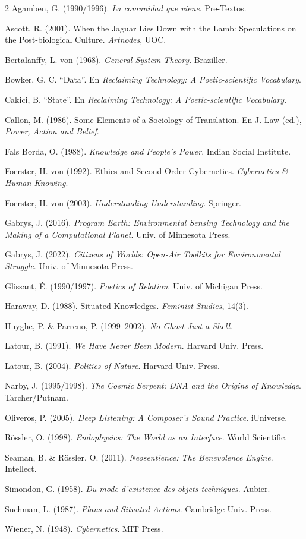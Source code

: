 \documentclass[11pt]{article}
\begin{document}
\begin{multicols}{2}\footnotesize\setlength{\parindent}{-1em}\setlength{\leftskip}{1em}\setlength{\parskip}{0.4em}
Agamben, G. (1990/1996). \emph{La comunidad que viene}. Pre-Textos.\par
Ascott, R. (2001). When the Jaguar Lies Down with the Lamb: Speculations on the Post-biological Culture. \emph{Artnodes}, UOC.\par
Bertalanffy, L. von (1968). \emph{General System Theory}. Braziller.\par
Bowker, G. C. ``Data''. En \emph{Reclaiming Technology: A Poetic-scientific Vocabulary}.\par
Cakici, B. ``State''. En \emph{Reclaiming Technology: A Poetic-scientific Vocabulary}.\par
Callon, M. (1986). Some Elements of a Sociology of Translation. En J. Law (ed.), \emph{Power, Action and Belief}.\par
Fals Borda, O. (1988). \emph{Knowledge and People's Power}. Indian Social Institute.\par
Foerster, H. von (1992). Ethics and Second-Order Cybernetics. \emph{Cybernetics \& Human Knowing}.\par
Foerster, H. von (2003). \emph{Understanding Understanding}. Springer.\par
Gabrys, J. (2016). \emph{Program Earth: Environmental Sensing Technology and the Making of a Computational Planet}. Univ. of Minnesota Press.\par
Gabrys, J. (2022). \emph{Citizens of Worlds: Open-Air Toolkits for Environmental Struggle}. Univ. of Minnesota Press.\par
Glissant, É. (1990/1997). \emph{Poetics of Relation}. Univ. of Michigan Press.\par
Haraway, D. (1988). Situated Knowledges. \emph{Feminist Studies}, 14(3).\par
Huyghe, P. \& Parreno, P. (1999--2002). \emph{No Ghost Just a Shell}.\par
Latour, B. (1991). \emph{We Have Never Been Modern}. Harvard Univ. Press.\par
Latour, B. (2004). \emph{Politics of Nature}. Harvard Univ. Press.\par
Narby, J. (1995/1998). \emph{The Cosmic Serpent: DNA and the Origins of Knowledge}. Tarcher/Putnam.\par
Oliveros, P. (2005). \emph{Deep Listening: A Composer's Sound Practice}. iUniverse.\par
Rössler, O. (1998). \emph{Endophysics: The World as an Interface}. World Scientific.\par
Seaman, B. \& Rössler, O. (2011). \emph{Neosentience: The Benevolence Engine}. Intellect.\par
Simondon, G. (1958). \emph{Du mode d'existence des objets techniques}. Aubier.\par
Suchman, L. (1987). \emph{Plans and Situated Actions}. Cambridge Univ. Press.\par
Wiener, N. (1948). \emph{Cybernetics}. MIT Press.\par
\end{multicols}
\end{document}
